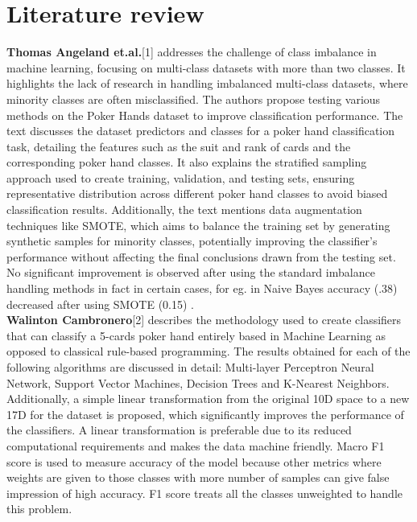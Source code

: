 \documentclass[11pt, oneside]{article}   	%
\begin{document}
\section{Literature review}
\textbf{Thomas Angeland et.al.}[1] addresses the challenge of class imbalance in machine learning, focusing on multi-class datasets with more than two classes. It highlights the lack of research in handling imbalanced multi-class datasets, where minority classes are often misclassified. The authors propose testing various methods on the Poker Hands dataset to improve classification performance.
The text discusses the dataset predictors and classes for a poker hand classification task, detailing the features such as the suit and rank of cards and the corresponding poker hand classes. It also explains the stratified sampling approach used to create training, validation, and testing sets, ensuring representative distribution across different poker hand classes to avoid biased classification results. Additionally, the text mentions data augmentation techniques like SMOTE, which aims to balance the training set by generating synthetic samples for minority classes, potentially improving the classifier's performance without affecting the final conclusions drawn from the testing set.
No significant improvement is observed after using the standard imbalance handling methods in fact in certain cases, for eg. in Naive Bayes accuracy (.38) decreased after using SMOTE (0.15) .\\
\textbf{Walinton Cambronero}[2] describes the methodology used to create classifiers that can classify a 5-cards poker hand entirely based in Machine Learning as opposed to classical rule-based programming. The results obtained for each of the following algorithms are discussed in detail: Multi-layer Perceptron Neural Network, Support Vector Machines, Decision Trees and K-Nearest Neighbors. Additionally, a simple linear transformation from the original 10D space to a new 17D for the dataset is proposed, which significantly improves the performance of the classifiers. A linear transformation is preferable due to its reduced computational requirements and makes the data machine friendly. Macro F1 score is used to measure accuracy of the model because other metrics where weights are given to those classes with more number of samples can give false impression of high accuracy. F1 score treats all the classes unweighted to handle this problem.
\\
\end{document}
